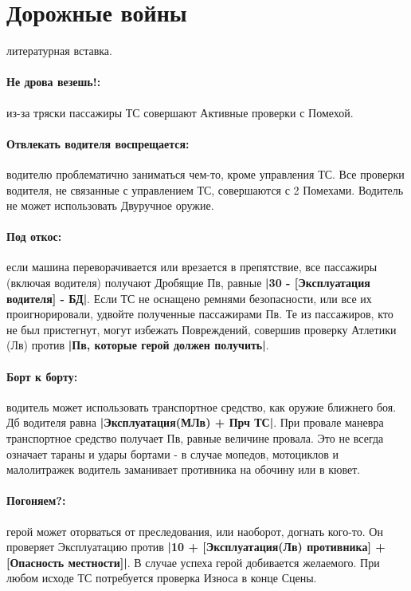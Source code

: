 \section{Дорожные войны}
\tbd литературная вставка.
\paragraph{Не дрова везешь!:} из-за тряски пассажиры ТС совершают Активные проверки с Помехой. 
\paragraph{Отвлекать водителя воспрещается:} водителю проблематично заниматься чем-то, кроме управления ТС. Все проверки водителя, не связанные с управлением ТС, совершаются с 2 Помехами. Водитель не может использовать Двуручное оружие.
\paragraph{Под откос:} если машина переворачивается или врезается в препятствие, все пассажиры (включая водителя) получают Дробящие Пв, равные \textbf{|30 - [Эксплуатация водителя] - БД|}. Если ТС не оснащено ремнями безопасности, или все их проигнорировали, удвойте полученные пассажирами Пв. 
\newline Те из пассажиров, кто не был пристегнут, могут избежать Повреждений, совершив проверку Атлетики (Лв) против \textbf{|Пв, которые герой должен получить|}.
\paragraph{Борт к борту:} водитель может использовать транспортное средство, как оружие ближнего боя. Дб водителя равна \textbf{|Эксплуатация(МЛв) + Прч ТС|}. При провале маневра транспортное средство получает Пв, равные величине провала. Это не всегда означает тараны и удары бортами - в случае мопедов, мотоциклов и малолитражек водитель заманивает противника на обочину или в кювет.
\paragraph{Погоняем?:} герой может оторваться от преследования, или наоборот, догнать кого-то. Он проверяет Эксплуатацию против \textbf{|10 + [Эксплуатация(Лв) противника] + [Опасность местности]|}. В случае успеха герой добивается желаемого. При любом исходе ТС потребуется проверка Износа в конце Сцены.
